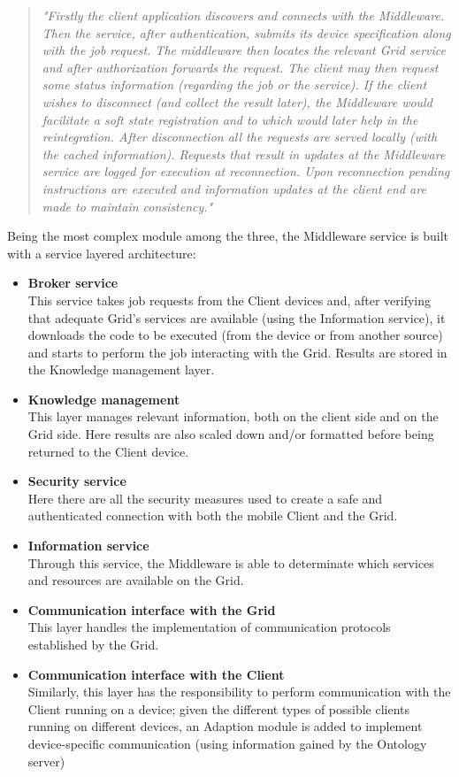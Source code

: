 \begin{quotation}
    \textit{"Firstly the client application discovers and connects with the Middleware. Then the service, after authentication, submits its device specification along with the job request. The middleware then locates the relevant Grid service and after authorization forwards the request. The client may then request some status information (regarding the job or the service). If the client wishes to disconnect (and collect the result later), the Middleware would facilitate a soft state registration and to which would later help in the reintegration. After disconnection all the requests are served locally (with the cached information). Requests that result in updates at the Middleware service are logged for execution at reconnection. Upon reconnection pending instructions are executed and information updates at the client end are made to maintain consistency." \cite{mobile_to_grid_middleware}}
\end{quotation}

Being the most complex module among the three, the Middleware service is built with a service layered architecture:
\begin{itemize}
    \item \textbf{Broker service}\\
    This service takes job requests from the Client devices and, after verifying that adequate Grid's services are available (using the Information service), it downloads the code to be executed (from the device or from another source) and starts to perform the job interacting with the Grid. Results are stored in the Knowledge management layer.
    \item \textbf{Knowledge management}\\
    This layer manages relevant information, both on the client side and on the Grid side. Here results are also scaled down and/or formatted before being returned to the Client device.
    \item \textbf{Security service}\\
    Here there are all the security measures used to create a safe and authenticated connection with both the mobile Client and the Grid. 
    \item \textbf{Information service}\\
    Through this service, the Middleware is able to determinate which services and resources are available on the Grid.
    \item \textbf{Communication interface with the Grid}\\
    This layer handles the implementation of communication protocols established by the Grid.
    \item \textbf{Communication interface with the Client}\\
    Similarly, this layer has the responsibility to perform communication with the Client running on a device; given the different types of possible clients running on different devices, an Adaption module is added to implement device-specific communication (using information gained by the Ontology server)
\end{itemize}


